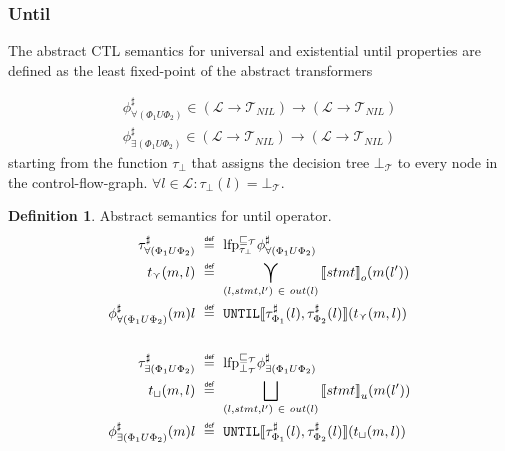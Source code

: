 \documentclass[11pt,a4paper,titlepage]{article}
\theoremstyle{definition}
\newtheorem{definition}{Definition}[section]
\newcommand\eqdef{\mathrel{\overset{\makebox[0pt]{\mbox{\normalfont\tiny\sffamily def}}}{=}}}
\begin{document}
\subsubsection*{Until}
The abstract CTL semantics for universal and existential \textsf{until} properties are defined as the least fixed-point of the abstract transformers

\begin{align*}
    \phi^\sharp_{\forall(\Phi_1 U \Phi_2)}
    \in (\mathcal{L} \rightarrow \mathcal{T}_{NIL}) \rightarrow (\mathcal{L} \rightarrow \mathcal{T}_{NIL})\\
    \phi^\sharp_{\exists(\Phi_1 U \Phi_2)} 
    \in (\mathcal{L} \rightarrow \mathcal{T}_{NIL}) \rightarrow (\mathcal{L} \rightarrow \mathcal{T}_{NIL})
\end{align*}
starting from the function $\tau_\bot$ that assigns the decision tree $\bot_\mathcal{T}$ to every 
node in the control-flow-graph. $\forall l \in \mathcal{L} \colon \tau_\bot(l) = \bot_\mathcal{T}$.

\begin{definition}\label{def:abstract_until_semantics}
    Abstract semantics for \textsf{until} operator. 
    \setlength{\jot}{15pt}
    \begin{align*}
        \tau^\sharp_{\forall(\Phi_1 U \Phi_2)} \ &\eqdef \ \text{lfp}^{\sqsubseteq_{\mathcal{T}}}_{\tau_\bot} \phi^\sharp_{\forall(\Phi_1 U \Phi_2)}\\
        t_{\curlyvee}(m, l)  \ &\eqdef \ \bigcurlyvee\limits_{(l, stmt, l') \ \in \ out(l) } {\llbracket stmt \rrbracket}_{o} ( m(l')) \\
        \phi^\sharp_{\forall(\Phi_1 U \Phi_2)}(m)l \ &\eqdef \ \mathtt{UNTIL}\llbracket \tau^\sharp_{\Phi_1}(l), \tau^\sharp_{\Phi_2}(l) \rrbracket (t_{\curlyvee}(m, l))  \\\\
        \tau^\sharp_{\exists(\Phi_1 U \Phi_2)} \ &\eqdef \ \text{lfp}^{\sqsubseteq_{\mathcal{T}}}_{\bot_\mathcal{T}} \phi^\sharp_{\exists(\Phi_1 U \Phi_2)}\\
        t_{\sqcup}(m, l) \ &\eqdef \ \bigsqcup\limits_{(l, stmt, l') \ \in \ out(l) } {\llbracket stmt \rrbracket}_{u} (m(l')) \\
        \phi^\sharp_{\exists(\Phi_1 U \Phi_2)}(m)l \ &\eqdef \ \mathtt{UNTIL}\llbracket \tau^\sharp_{\Phi_1}(l), \tau^\sharp_{\Phi_2}(l) \rrbracket ( t_{\sqcup}(m, l))
    \end{align*}\\
\end{definition}
\end{document}
